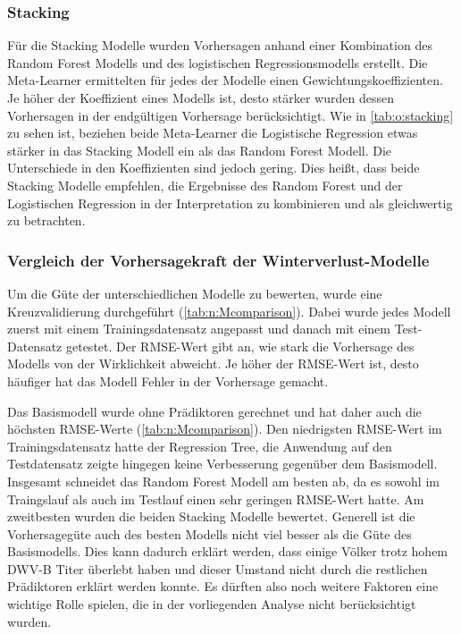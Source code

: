  
\subsubsection{Stacking}

Für die Stacking Modelle wurden Vorhersagen anhand einer Kombination des Random Forest Modells und des logistischen Regressionsmodells erstellt. Die Meta-Learner ermittelten für jedes der Modelle einen Gewichtungskoeffizienten. Je höher der Koeffizient eines Modells ist, desto stärker wurden dessen Vorhersagen in der endgültigen Vorhersage berücksichtigt. Wie in \cref{tab:o:stacking} zu sehen ist, beziehen beide Meta-Learner die Logistische Regression etwas stärker in das Stacking Modell ein als das Random Forest Modell. Die Unterschiede in den Koeffizienten sind jedoch gering. Dies heißt, dass beide Stacking Modelle empfehlen, die Ergebnisse des Random Forest und der Logistischen Regression in der Interpretation zu kombinieren und als gleichwertig zu betrachten.



 
\subsubsection{Vergleich der Vorhersagekraft der Winterverlust-Modelle} \label{chap:vorhersage.modelle}
 
 Um die Güte der unterschiedlichen Modelle zu bewerten, wurde eine Kreuzvalidierung durchgeführt (\cref{tab:n:Mcomparison}). Dabei wurde jedes Modell zuerst mit einem Trainingsdatensatz angepasst und danach mit einem Test-Datensatz getestet. Der RMSE-Wert gibt an, wie stark die Vorhersage des Modells von der Wirklichkeit abweicht. Je höher der RMSE-Wert ist, desto häufiger hat das Modell Fehler in der Vorhersage gemacht.
 
 Das Basismodell wurde ohne Prädiktoren gerechnet und hat daher auch die höchsten RMSE-Werte (\cref{tab:n:Mcomparison}). Den niedrigsten RMSE-Wert im Trainingsdatensatz hatte der Regression Tree, die Anwendung auf den Testdatensatz zeigte hingegen keine Verbesserung gegenüber dem Basismodell. Insgesamt schneidet das Random Forest Modell am besten ab, da es sowohl im Traingslauf als auch im Testlauf einen sehr geringen RMSE-Wert hatte. Am zweitbesten wurden die beiden Stacking Modelle bewertet. Generell ist die Vorhersagegüte auch des besten Modells nicht viel besser als die Güte des Basismodells. Dies kann dadurch erklärt werden, dass einige Völker trotz hohem DWV-B Titer überlebt haben und dieser Umstand nicht durch die restlichen Prädiktoren erklärt werden konnte. Es dürften also noch weitere Faktoren eine wichtige Rolle spielen, die in der vorliegenden Analyse nicht berücksichtigt wurden.
 
